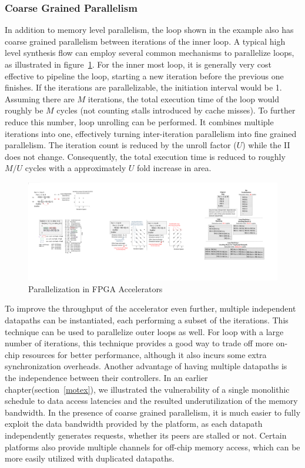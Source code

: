 \subsubsection{Coarse Grained Parallelism}
\label{subsec:cgp}

In addition to memory level parallelism, the loop shown in the example also has coarse grained parallelism between iterations of the inner loop. A typical high level synthesis flow can employ several common mechanisms to parallelize loops, as illustrated in figure~\ref{fig:fpgaparal}. 
For the inner most
loop, it is generally very cost effective to pipeline the loop, starting a new iteration before the previous one finishes. If
the iterations are parallelizable, the initiation interval would be 1.
Assuming there are $M$ iterations, the total execution time of the loop
would roughly be $M$ cycles (not counting stalls introduced by cache misses). To further reduce this number, loop unrolling
can be performed. It combines multiple iterations into one, effectively
turning inter-iteration parallelism into fine grained parallelism. 
The iteration count is reduced by the unroll factor ($U$) while the II does not change. Consequently, the total execution time is reduced to roughly $M/U$ cycles with a approximately $U$ fold increase in area. 

\begin{figure}[htp]
\begin{center}
\includegraphics[width=0.8\linewidth]{chap6fig/fpgaParallel.pdf}
\caption{Parallelization in FPGA Accelerators
\label{fig:fpgaparal}}
\end{center}
\end{figure}

To improve the throughput of the accelerator even further, multiple
independent datapaths can be instantiated, each performing a subset of 
the iterations. This technique can be used to parallelize outer loops
as well. For loop with a large number of iterations, this technique provides a good way to trade off more on-chip resources for better performance, although
it also incurs some extra synchronization overheads. Another advantage of
having multiple datapaths is the independence between their controllers.
In an earlier chapter(section~\ref{motex}), we illustrated the vulnerability
of a single monolithic schedule to data access latencies and the resulted
underutilization of the memory bandwidth. In the presence of coarse grained parallelism, it is much easier to fully exploit the data bandwidth provided
by the platform, as each datapath independently generates requests, whether
its peers are stalled or not. 
Certain platforms also provide multiple channels
for off-chip memory access, which can be more easily utilized with duplicated datapaths. 


